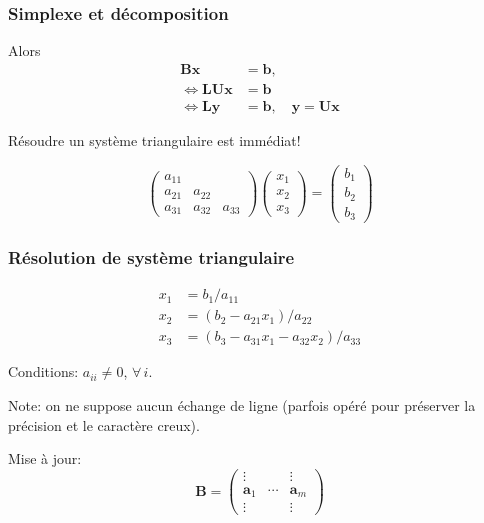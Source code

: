 \documentclass[usepdftitle=false]{beamer}
\def\ba{\boldsymbol{a}}
\def\bb{\boldsymbol{b}}
\def\bx{\boldsymbol{x}}
\def\by{\boldsymbol{y}}
\def\bB{\boldsymbol{B}}
\def\bL{\boldsymbol{L}}
\def\bU{\boldsymbol{U}}
\begin{document}
\begin{frame}
\frametitle{Simplexe et décomposition}

Alors
\begin{align*}
\bB \bx & = \bb, \\
\Leftrightarrow \bL\bU\bx &= \bb \\
\Leftrightarrow \bL \by &= \bb, \quad \by = \bU\bx
\end{align*}

\mbox{}

Résoudre un système triangulaire est immédiat!

\mbox{}

\[
\begin{pmatrix}
a_{11} & & \\
a_{21} & a_{22} & \\
a_{31} & a_{32} & a_{33}
\end{pmatrix}
\begin{pmatrix}
x_1 \\ x_2 \\ x_3
\end{pmatrix}
=
\begin{pmatrix}
b_1 \\ b_2 \\ b_3
\end{pmatrix}
\]

\end{frame}

\begin{frame}
\frametitle{Résolution de système triangulaire}

\begin{align*}
x_1 &= b_1/a_{11} \\
x_2 &= (b_2 - a_{21}x_1)/a_{22} \\
x_3 &= (b_3 - a_{31}x_1 - a_{32}x_2)/a_{33}
\end{align*}

\mbox{}

Conditions: $a_{ii} \ne 0$, $\forall \, i$.

\mbox{}

Note: on ne suppose aucun échange de ligne (parfois opéré pour préserver la précision et le caractère creux).

\mbox{}

Mise à jour:
\[
\bB =
\begin{pmatrix}
\vdots & & \vdots \\
\ba_1 & \cdots & \ba_m \\
\vdots & & \vdots
\end{pmatrix}
\]

\end{frame}
\end{document}
